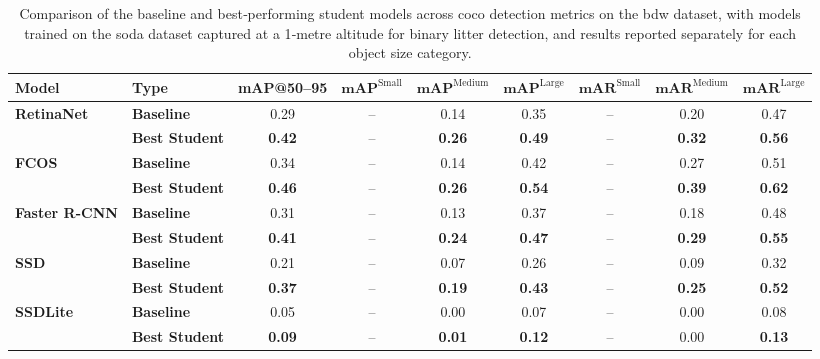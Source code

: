 \begin{table*}[htbp]
\centering
\renewcommand{\arraystretch}{1.5} %
\begin{adjustbox}{width=\textwidth}
\begin{tabular}{llccccccc}
\hline
\textbf{Model} & \textbf{Type} & \textbf{mAP@50--95} & \(\mathbf{mAP}^{\text{Small}}\) & \(\mathbf{mAP}^{\text{Medium}}\) & \(\mathbf{mAP}^{\text{Large}}\) & \(\mathbf{mAR}^{\text{Small}}\) & \(\mathbf{mAR}^{\text{Medium}}\) & \(\mathbf{mAR}^{\text{Large}}\) \\ \hline
\multirow{2}{*}{\textbf{RetinaNet}} 
 & \textbf{Baseline}      & 0.29 & --    & 0.14 & 0.35 & --    & 0.20 & 0.47 \\
 & \textbf{Best Student}  & \textbf{0.42} & --    & \textbf{0.26} & \textbf{0.49} & --    & \textbf{0.32} & \textbf{0.56} \\ \hline
\multirow{2}{*}{\textbf{FCOS}} 
 & \textbf{Baseline}      & 0.34 & --    & 0.14 & 0.42 & --    & 0.27 & 0.51 \\
 & \textbf{Best Student}  & \textbf{0.46} & --    & \textbf{0.26} & \textbf{0.54} & --    & \textbf{0.39} & \textbf{0.62} \\ \hline
\multirow{2}{*}{\textbf{Faster R-CNN}} 
 & \textbf{Baseline}      & 0.31 & --    & 0.13 & 0.37 & --    & 0.18 & 0.48 \\
 & \textbf{Best Student}  & \textbf{0.41} & --    & \textbf{0.24} & \textbf{0.47} & --    & \textbf{0.29} & \textbf{0.55} \\ \hline
\multirow{2}{*}{\textbf{SSD}} 
 & \textbf{Baseline}      & 0.21 & --    & 0.07 & 0.26 & --    & 0.09 & 0.32 \\
 & \textbf{Best Student}  & \textbf{0.37} & --    & \textbf{0.19} & \textbf{0.43} & --    & \textbf{0.25} & \textbf{0.52} \\ \hline
\multirow{2}{*}{\textbf{SSDLite}} 
 & \textbf{Baseline}      & 0.05 & --    & 0.00 & 0.07 & --    & 0.00 & 0.08 \\
 & \textbf{Best Student}  & \textbf{0.09} & --    & \textbf{0.01} & \textbf{0.12} & --    & 0.00 & \textbf{0.13} \\ \hline
\end{tabular}
\end{adjustbox}
\caption{Comparison of the baseline and best‐performing student models across \gls{coco} detection metrics on the \gls{bdw} dataset, with models trained on the \gls{soda} dataset captured at a 1‐metre altitude for binary litter detection, and results reported separately for each object size category.}
\label{tab:bdw_object_sizes_split}
\end{table*}

